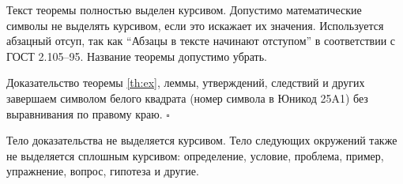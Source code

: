 \begin{m-theorem}[о неполноте] %
	\label{th:ex} 
	Текст теоремы полностью выделен курсивом. Допустимо математические символы не выделять курсивом, если это искажает их значения. Используется абзацный отсуп, так как ``Абзацы в тексте начинают отступом'' в соответствии с ГОСТ 2.105--95. Название теоремы допустимо убрать.
\end{m-theorem}
Доказательство теоремы \ref{th:ex}, леммы, утверждений, следствий и других завершаем символом белого квадрата (номер символа в Юникод 25A1) без выравнивания по правому краю. $\square$

Тело доказательства не выделяется курсивом.
Тело следующих окружений также не выделяется сплошным курсивом: определение, условие, проблема, пример, упражнение, вопрос, гипотеза и другие.